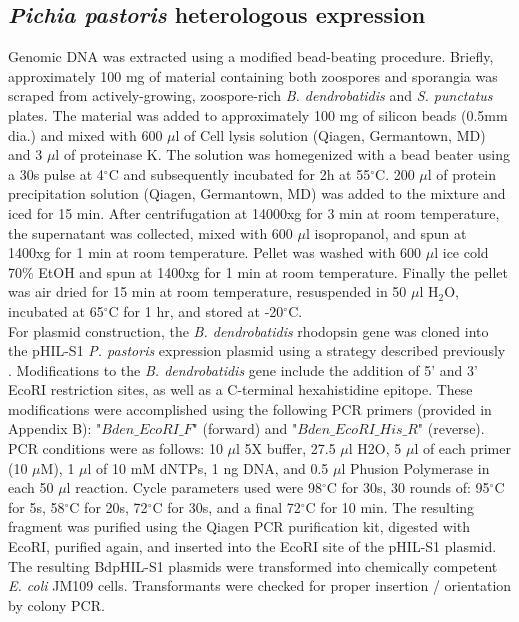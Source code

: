 \subsection*{\textit{Pichia pastoris} heterologous expression}
Genomic DNA was extracted using a modified bead-beating procedure. Briefly, approximately 100 mg of material containing both zoospores and sporangia was scraped from actively-growing, zoospore-rich \textit{B. dendrobatidis} and \textit{S. punctatus} plates. The material was added to approximately 100 mg of silicon beads (0.5mm dia.) and mixed with 600 $\mu$l of Cell lysis solution (Qiagen, Germantown, MD) and 3 $\mu$l of proteinase K. The solution was homegenized with a bead beater using a 30s pulse at 4$^{\circ}$C and subsequently incubated for 2h at 55$^{\circ}$C. 200 $\mu$l of protein precipitation solution (Qiagen, Germantown, MD) was added to the mixture and iced for 15 min. After centrifugation at 14000xg for 3 min at room temperature, the supernatant was collected, mixed with 600 $\mu$l isopropanol, and spun at 1400xg for 1 min at room temperature. Pellet was washed with 600 $\mu$l ice cold 70\% EtOH and spun at 1400xg for 1 min at room temperature. Finally the pellet was air dried for 15 min at room temperature, resuspended in 50 $\mu$l H$_{2}$O, incubated at 65$^{\circ}$C for 1 hr, and stored at -20$^{\circ}$C.\\
\indent For plasmid construction, the \textit{B. dendrobatidis} rhodopsin gene was cloned into the pHIL-S1 \textit{P. pastoris} expression plasmid using a strategy described previously \cite{Bieszke1999}.  Modifications to the \textit{B. dendrobatidis} gene include the addition of 5' and 3' EcoRI restriction sites, as well as a C-terminal hexahistidine epitope. These modifications were accomplished using the following PCR primers (provided in Appendix B): "$Bden\_EcoRI\_F$" (forward) and "$Bden\_EcoRI\_His\_R$" (reverse). PCR conditions were as follows: 10 $\mu$l 5X buffer, 27.5 $\mu$l H2O, 5 $\mu$l of each primer (10 $\mu$M), 1 $\mu$l of 10 mM dNTPs, 1 ng DNA, and 0.5 $\mu$l Phusion Polymerase in each 50 $\mu$l reaction. Cycle parameters used were 98$^{\circ}$C for 30s, 30 rounds of: 95$^{\circ}$C for 5s, 58$^{\circ}$C for 20s, 72$^{\circ}$C for 30s, and a final 72$^{\circ}$C for 10 min. The resulting fragment was purified using the Qiagen PCR purification kit, digested with EcoRI, purified again, and inserted into the EcoRI site of the pHIL-S1 plasmid. The resulting BdpHIL-S1 plasmids were transformed into chemically competent \textit{E. coli} JM109 cells. Transformants were checked for proper insertion / orientation by colony PCR.\\ 
